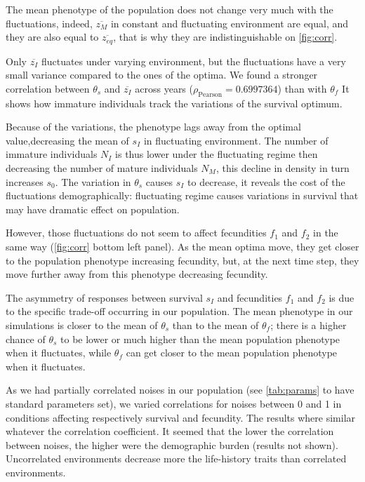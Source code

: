 The mean phenotype of the population does not change very much with the fluctuations, indeed, $\overline{z_M}$ in constant and fluctuating environment are equal, and they are also equal to $\overline{z_{eq}}$, that is why they are indistinguishable on \autoref{fig:corr}.

Only $\overline{z_I}$ fluctuates under varying environment, but the fluctuations have a very small variance compared to the ones of the optima. We found a stronger correlation between $\theta_s$ and $\overline{z_I}$ across years ($\rho_{\text{Pearson}} = 0.6997364$) than with $\theta_f$ It shows how immature individuals track the variations of the survival optimum.

Because of the variations, the phenotype lags away from the optimal value,decreasing the mean of $s_I$ in fluctuating environment. The number of immature individuals $N_I$ is thus lower under the fluctuating regime then decreasing the number of mature individuals $N_M$, this decline in density in turn increases $s_0$. The variation in $\theta_s$ causes $s_I$ to decrease, it reveals the cost of the fluctuations demographically: fluctuating regime causes variations in survival that may have dramatic effect on population.

However, those fluctuations do not seem to affect fecundities $f_1$ and $f_2$ in the same way (\autoref{fig:corr} bottom left panel). As the mean optima move, they get closer to the population phenotype increasing fecundity, but, at the next time step, they move further away from this phenotype decreasing fecundity.

The asymmetry of responses between survival $s_I$ and fecundities $f_1$ and $f_2$ is due to the specific trade-off occurring in our population. The mean phenotype in our simulations is closer to the mean of $\theta_s$ than to the mean of $\theta_f$; there is a higher chance of $\theta_s$ to be lower or much higher than the mean population phenotype when it fluctuates, while $\theta_f$ can get closer to the mean population phenotype when it fluctuates.

As we had partially correlated noises in our population (see \autoref{tab:params} to have standard parameters set), we varied correlations for noises between 0 and 1 in conditions affecting respectively survival and fecundity. The results where similar whatever the correlation coefficient. It seemed that the lower the correlation between noises, the higher were the demographic burden (results not shown). Uncorrelated environments decrease more the life-history traits than correlated environments.

